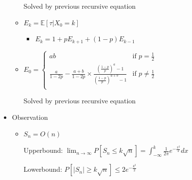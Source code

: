 \documentclass[a4paper]{article}
\begin{document}
\begin{itemize}
\begin{itemize}
                Solved by previous recursive equation
            \item $E_k = \mathbb{E}[\tau|X_0 = k]$
                \begin{itemize}
                    \item $E_k = 1 + p E_{k+1} + (1-p) E_{k-1}$
                \end{itemize}
            \item $E_0 = \left\{ \begin{array}{cc}
                        ab & \text{if } p = \frac{1}{2} \\
                        \frac{a}{1-2p} - \frac{a+b}{1-2p} \times \frac{(\frac{1-p}{p})^a - 1}{(\frac{1-p}{p})^{a+b} - 1} & \text{if } p \not = \frac{1}{2} \\
                \end{array} \right.$

                Solved by previous recursive equation
        \end{itemize}
    \item Observation
        \begin{itemize}
            \item $S_n = O(n)$

                Upperbound: $\lim_{n \rightarrow \infty} P[S_n \leq k\sqrt{n}] = \int_{-\infty}^k \frac{1}{2 \pi} e^{-\frac{x^2}{2}} dx$

                Lowerbound: $P[|S_n| \geq k\sqrt{n}] \leq 2 e^{-\frac{k^2}{2}}$
        \end{itemize}
\end{itemize}
\end{document}
